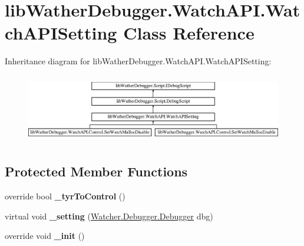 \hypertarget{classlib_wather_debugger_1_1_watch_a_p_i_1_1_watch_a_p_i_setting}{\section{lib\+Wather\+Debugger.\+Watch\+A\+P\+I.\+Watch\+A\+P\+I\+Setting Class Reference}
\label{classlib_wather_debugger_1_1_watch_a_p_i_1_1_watch_a_p_i_setting}
}
Inheritance diagram for lib\+Wather\+Debugger.\+Watch\+A\+P\+I.\+Watch\+A\+P\+I\+Setting\+:\begin{figure}[H]
\begin{center}
\leavevmode
\includegraphics[height=3.027027cm]{classlib_wather_debugger_1_1_watch_a_p_i_1_1_watch_a_p_i_setting}
\end{center}
\end{figure}
\subsection*{Protected Member Functions}
\begin{DoxyCompactItemize}
\item 
\hypertarget{classlib_wather_debugger_1_1_watch_a_p_i_1_1_watch_a_p_i_setting_a7ce32be7872a5f727705bebaef2e6f33}{override bool {\bfseries \+\_\+tyr\+To\+Control} ()}\label{classlib_wather_debugger_1_1_watch_a_p_i_1_1_watch_a_p_i_setting_a7ce32be7872a5f727705bebaef2e6f33}

\item 
\hypertarget{classlib_wather_debugger_1_1_watch_a_p_i_1_1_watch_a_p_i_setting_a547779764213dd53b30903fd6efe95e5}{virtual void {\bfseries \+\_\+setting} (\hyperlink{class_watcher_1_1_debugger_1_1_debugger}{Watcher.\+Debugger.\+Debugger} dbg)}\label{classlib_wather_debugger_1_1_watch_a_p_i_1_1_watch_a_p_i_setting_a547779764213dd53b30903fd6efe95e5}

\item 
\hypertarget{classlib_wather_debugger_1_1_watch_a_p_i_1_1_watch_a_p_i_setting_afab50e8217e7f438d2593c81a51988c6}{override void {\bfseries \+\_\+init} ()}\label{classlib_wather_debugger_1_1_watch_a_p_i_1_1_watch_a_p_i_setting_afab50e8217e7f438d2593c81a51988c6}

\end{DoxyCompactItemize}
